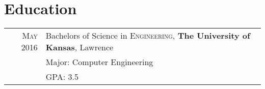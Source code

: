\documentclass[10pt]{article} %
\begin{document}

\section{Education}

\begin{table}[h]
\centering
\begin{tabular}{rl}	
\textsc{May} 2016 & Bachelors of Science in \textsc{Engineering}, \textbf{The University of Kansas}, Lawrence\\
& Major: Computer Engineering \\
&\normalsize \textsc{GPA}: 3.5\\
\end{tabular}
\end{table}


\end{document}
